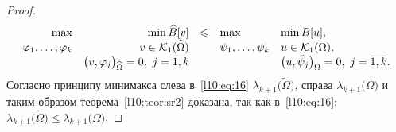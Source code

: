 \begin{proof}
	\begin{equation}\label{l10:eq:16}
		\hfill\begin{array}{rrcll}
			\max&\min\widehat{B}[v]&\leqslant&\max&\min B[u],\\
			\phi_1,\ldots,\phi_k&v\in\K_1(\widehat{\Omega})&  &\psi_1,\ldots,\psi_k &u\in\K_1(\Omega),\\
			&\big(v,\phi_j\big)_{\widehat{\Omega}}=0,\ j=\overline{1,k} & &  &\big(u,\check{\psi}_j\big)_{\Omega}=0,\ j=\overline{1,k}.
		\end{array}\hfill
	\end{equation}	
	Согласно принципу минимакса слева в~\eqref{l10:eq:16} $\lambda_{k+1}\big(\widetilde{\Omega}\big)$, справа $\lambda_{k+1}\big(\Omega\big)$ и таким образом теорема~\ref{l10:teor:sr2} доказана, так как в~\eqref{l10:eq:16}: $\lambda_{k+1}\big(\widetilde{\Omega}\big)\leqslant\lambda_{k+1}\big(\Omega\big)$.  
\end{proof}


